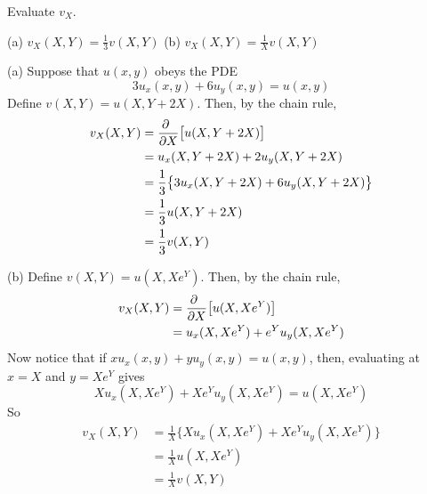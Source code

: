 \begin{hint}
Evaluate $v_X$.
\end{hint}

\begin{answer}
(a) $v_X(X,Y)=\frac{1}{3} v(X,Y)$\qquad
(b) $v_X(X,Y)=\frac{1}{X} v(X,Y)$
\end{answer}

\begin{solution}
(a) 
Suppose that $u(x,y)$ obeys the PDE 
\begin{equation*}
3u_x(x,y) + 6u_y(x,y)=u(x,y)
\end{equation*}
Define $v(X,Y) = u(X, Y+2X)$.
Then, by the chain rule,
\begin{align*}
v_X(X,Y)&=\pdiff{}{X}\big[ u(X, Y+2X)\big] \\
         &=u_x(X, Y+2X) +2u_y(X, Y+2X) \\
         &=\frac{1}{3}\big\{3u_x(X, Y+2X) + 6u_y(X, Y+2X)\big\} \\
         &=\frac{1}{3} u(X, Y+2X) \\
         &=\frac{1}{3} v(X,Y)
\end{align*}

(b) 
Define $v(X,Y) = u(X, Xe^Y)$.
Then, by the chain rule,
\begin{align*}
v_X(X,Y)&=\pdiff{}{X}\big[ u(X, Xe^Y)\big] \\
         &=u_x(X, Xe^Y) +e^Yu_y(X, Xe^Y) 
\end{align*}
Now notice that if $xu_x(x,y) + yu_y(x,y)=u(x,y)$, then, evaluating at $x=X$ and $y=Xe^Y$ gives 
\begin{equation*}
Xu_x(X, Xe^Y) + Xe^Yu_y(X, Xe^Y)=u(X, Xe^Y)
\end{equation*}
So
\begin{align*}
v_X(X,Y) &=\frac{1}{X}\big\{X u_x(X, Xe^Y) +X e^Y u_y(X, Xe^Y) \big\} \\
         &=\frac{1}{X} u(X, Xe^Y) \\
         &=\frac{1}{X} v(X,Y)
\end{align*}
\end{solution}

